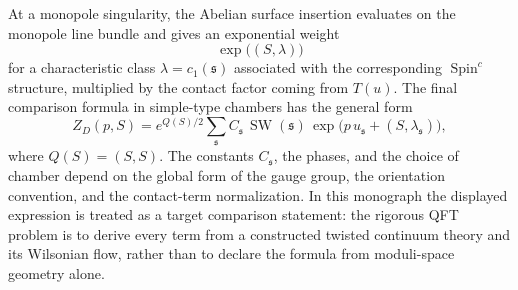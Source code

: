 At a monopole singularity, the Abelian surface insertion evaluates on the
monopole line bundle and gives an exponential weight
\[
  \exp\bigl((S,\lambda)\bigr)
\]
for a characteristic class \(\lambda=c_1(\mathfrak s)\) associated with the
corresponding \(\operatorname{Spin}^c\) structure, multiplied by the contact
factor coming from \(T(u)\).  The final comparison formula in simple-type
chambers has the general form
\[
  Z_D(p,S)
  =
  e^{Q(S)/2}
  \sum_{\mathfrak s}
  C_{\mathfrak s}\,
  \operatorname{SW}(\mathfrak s)\,
  \exp\bigl(p\,u_{\mathfrak s}+(S,\lambda_{\mathfrak s})\bigr),
\]
where \(Q(S)=(S,S)\).  The constants \(C_{\mathfrak s}\), the phases, and the
choice of chamber depend on the global form of the gauge group, the
orientation convention, and the contact-term normalization.  In this
monograph the displayed expression is treated as a target comparison statement:
the rigorous QFT problem is to derive every term from a constructed twisted
continuum theory and its Wilsonian flow, rather than to declare the formula
from moduli-space geometry alone.


